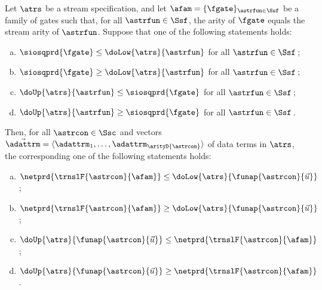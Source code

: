 \begin{lemma}
  \label{lem2:outsourcing}
Let $\atrs$ be a stream specification, and let\/
  $\afam = \{\fgate\}_{\astrfun\in\Ssf}$ be a family of gates
  such that, for all\/ $\astrfun\in\Ssf$, the arity of\/ $\fgate$
  equals the stream arity of\/ $\astrfun$.
Suppose that one of the following statements holds:
\begin{enumerate}[(a)]
\item $\siosqprd{\fgate} \le \doLow{\atrs}{\astrfun}$ for all\/ $\astrfun \in \Ssf\,$;\label{lem2:outsourcing:item:1}\vspace{0.5ex}
\item $\siosqprd{\fgate} \ge \doLow{\atrs}{\astrfun}$ for all\/ $\astrfun \in \Ssf\,$;\label{lem2:outsourcing:item:2}\vspace{0.5ex}
\item $\doUp{\atrs}{\astrfun} \le \siosqprd{\fgate}$ for all\/ $\astrfun \in \Ssf\,$;\label{lem2:outsourcing:item:3}\vspace{0.5ex} 
\item $\doUp{\atrs}{\astrfun} \ge \siosqprd{\fgate}$ for all\/ $\astrfun \in \Ssf\,$.\label{lem2:outsourcing:item:4}\vspace{0.5ex}
\end{enumerate}
Then, for all $\astrcon\in\Ssc$
  and vectors 
  $\vec{\adattrm} = \langle \adattrm_1, \ldots, \adattrm_{\arityD{\astrcon}} \rangle$ 
  of data terms in $\atrs$,
  the corresponding one of the following statements holds:
\begin{enumerate}[(a)]
\item $\netprd{\trnslF{\astrcon}{\afam}} \le \doLow{\atrs}{\funap{\astrcon}{\vec{u}}}\,$;\vspace{0.5ex}
\item $\netprd{\trnslF{\astrcon}{\afam}} \ge \doLow{\atrs}{\funap{\astrcon}{\vec{u}}}\,$;\vspace{0.5ex}
\item $\doUp{\atrs}{\funap{\astrcon}{\vec{u}}} \le \netprd{\trnslF{\astrcon}{\afam}}\,$;\vspace{0.5ex}
\item $\doUp{\atrs}{\funap{\astrcon}{\vec{u}}} \ge \netprd{\trnslF{\astrcon}{\afam}}\,$.
\end{enumerate}
\end{lemma}




